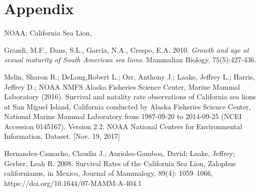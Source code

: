 \documentclass[12pt, a4paper]{article}
\begin{document}
\section{Appendix}

% 

\begin{thebibliography}{99}

NOAA: California Sea Lion, \\

Grandi, M.F., Dans, S.L., Garcia, N.A., Crespo, E.A. 2010. \emph{Growth and age at sexual maturity of South American sea lions}. Mammalian Biology, 75(5):427-436.   

Melin, Sharon R.; DeLong,Robert L.; Orr, Anthony J.; Laake, Jeffrey L.; Harris, Jeffrey D.; NOAA NMFS Alaska Fisheries Science Center, Marine Mammal Laboratory (2016). Survival and natality rate observations of California sea lions at San Miguel Island, California conducted by Alaska Fisheries Science Center, National Marine Mammal Laboratory from 1987-09-20 to 2014-09-25 (NCEI Accession 0145167). Version 2.2. NOAA National Centers for Environmental Information. Dataset. [Nov. 19, 2017]

Hernandez-Camacho, Claudia J.; Aurioles-Gamboa, David; Laake, Jeffrey; Gerber, Leah R. 2008. Survival Rates of the California Sea Lion, Zalophus californianus, in Mexico, Journal of Mammalogy, 89(4): 1059–1066, https://doi.org/10.1644/07-MAMM-A-404.1


\end{thebibliography}
\end{document}

